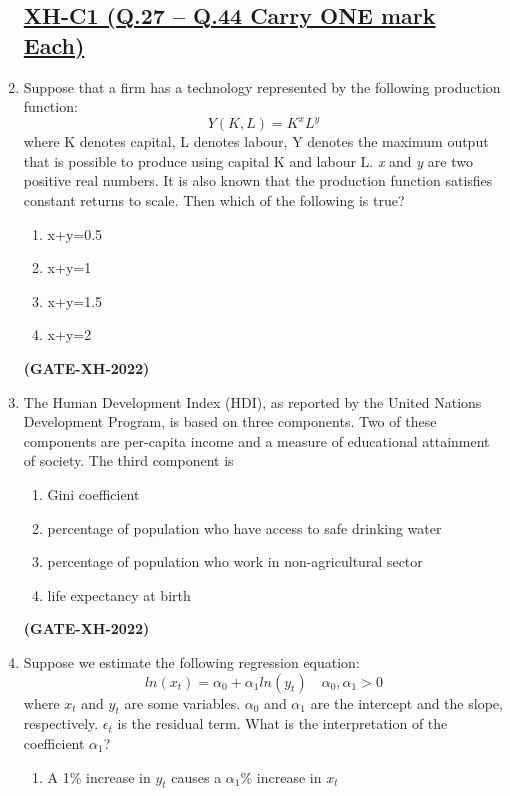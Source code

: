\documentclass[journal]{IEEEtran}
\begin{document}
\begin{enumerate}
\subsection*{\underline{\textbf { XH-C1 (Q.27 – Q.44 Carry ONE mark Each)}}}
\item Suppose that a firm has a technology represented by the following production function:\\
\begin{equation*}
   {Y(K,L)=K^x L^y}
\end{equation*}
  where K denotes capital, L denotes labour, Y denotes the maximum output that is possible to produce using capital K and labour L. \textit{x} and \textit{y} are two positive real numbers. It is also known that the production function satisfies constant returns to scale. Then which of the following is true?
\begin{enumerate}
\item x+y=0.5
\item x+y=1
\item x+y=1.5
\item x+y=2
\end{enumerate}
\hfill\textbf{(GATE-XH-2022)}
\item The Human Development Index (HDI), as reported by the United Nations Development Program, is based on three components. Two of these components are per-capita income and a measure of educational attainment of society. The third component is
\begin{enumerate}
\item Gini coefficient
\item percentage of population who have access to safe drinking water
\item percentage of population who work in non-agricultural sector
\item life expectancy at birth
\end{enumerate}
\hfill\textbf{(GATE-XH-2022)}

\item Suppose we estimate the following regression equation:
\begin{equation*}
    ln(x_t)=\alpha_0 +\alpha_1ln(y_t)\quad \alpha_0,\alpha_1>0
\end{equation*}
where $x_t$ and $y_t$ are some variables. $\alpha_0$ and $\alpha_1$ are the intercept and the slope,
respectively. $\epsilon_t$ is the residual term. What is the interpretation of the coefficient $\alpha_1$?
\begin{enumerate}
\item A 1\% increase in $y_t$ causes a $\alpha_1$\% increase in $x_t$
 

\end{enumerate}
\end{enumerate}
\end{document}
